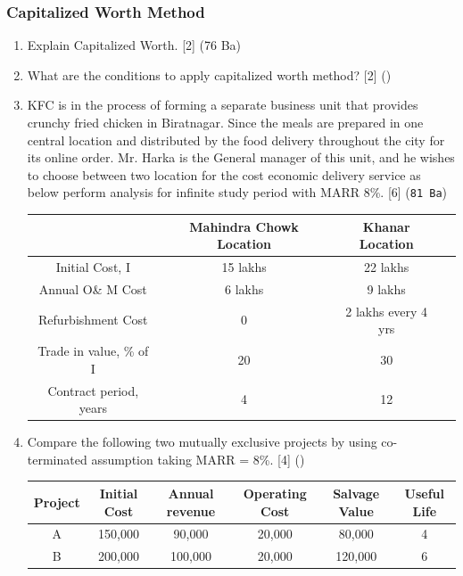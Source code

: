 \documentclass[12pt]{article}
\begin{document}
		\subsubsection{Capitalized Worth Method}
			\begin{enumerate}[noitemsep, topsep=0pt]
				\item Explain Capitalized Worth. \hfill [2] (76 Ba)		
				
				\item What are the conditions to apply capitalized worth method? \hfill [2] ()

				\item KFC is in the process of forming a separate business unit that provides crunchy fried chicken in Biratnagar. Since the meals are prepared in one central location and distributed by the food delivery throughout the city for its online order. Mr. Harka is the General manager of this unit, and he wishes to choose between two location for the cost economic delivery service as below perform analysis for infinite study period with MARR 8\%. \hfill [6] (\texttt{81 Ba})\\
				\begin{tabular}{|c|c|c|c|}
					\hline
					& Mahindra Chowk Location & Khanar Location \\ \hline
					Initial Cost, I & 15 lakhs & 22 lakhs \\ \hline
					Annual O\& M Cost & 6 lakhs & 9 lakhs \\ \hline
					Refurbishment Cost & 0 & 2 lakhs every 4 yrs \\ \hline
					Trade in value, \% of I & 20 & 30 \\ \hline
					Contract period, years & 4 & 12 \\ \hline
				\end{tabular}
				
				\item Compare the following two mutually exclusive projects by using co-terminated assumption taking MARR = 8\%. \hfill [4] () \\
				\begin{tabular}{|c|c|c|c|c|c|}
					\hline
					Project & Initial Cost & Annual revenue & Operating Cost & Salvage Value & Useful Life \\ \hline
					A & 150,000 & 90,000 & 20,000 & 80,000 & 4 \\ \hline
					B & 200,000 & 100,000 & 20,000 & 120,000 & 6 \\ \hline
				\end{tabular}
			\end{enumerate}
	
\end{document}
